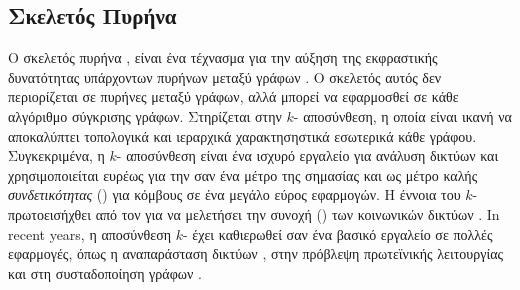 \subsection{Σκελετός Πυρήνα }
Ο σκελετός πυρήνα , είναι ένα τέχνασμα για την αύξηση της εκφραστικής δυνατότητας υπάρχοντων πυρήνων μεταξύ γράφων \cite{nikolentzos2018}.
Ο σκελετός αυτός δεν περιορίζεται σε πυρήνες μεταξύ γράφων, αλλά μπορεί να εφαρμοσθεί σε κάθε αλγόριθμο σύγκρισης γράφων.
Στηρίζεται στην $k$- αποσύνθεση, η οποία είναι ικανή να αποκαλύπτει τοπολογικά και ιεραρχικά χαρακτησηστικά εσωτερικά κάθε γράφου.
Συγκεκριμένα, η $k$- αποσύνθεση είναι ένα ισχυρό εργαλείο για ανάλυση δικτύων και χρησιμοποιείται ευρέως για την σαν ένα μέτρο της σημασίας και ως μέτρο καλής \textit{συνδετικότητας} () για κόμβους σε ένα μεγάλο εύρος εφαρμογών.
Η έννοια του $k$- πρωτοεισήχθει από τον  για να μελετήσει την συνοχή () των κοινωνικών δικτύων \cite{seidman1983network}.
In recent years, η αποσύνθεση $k$- έχει καθιερωθεί σαν ένα βασικό εργαλείο σε πολλές εφαρμογές, όπως η αναπαράσταση δικτύων \cite{alvarez2006large}, στην πρόβλεψη πρωτεϊνικής λειτουργίας \cite{wuchty2005peeling} και στη συσταδοποίηση γράφων \cite{giatsidis2014corecluster}.

